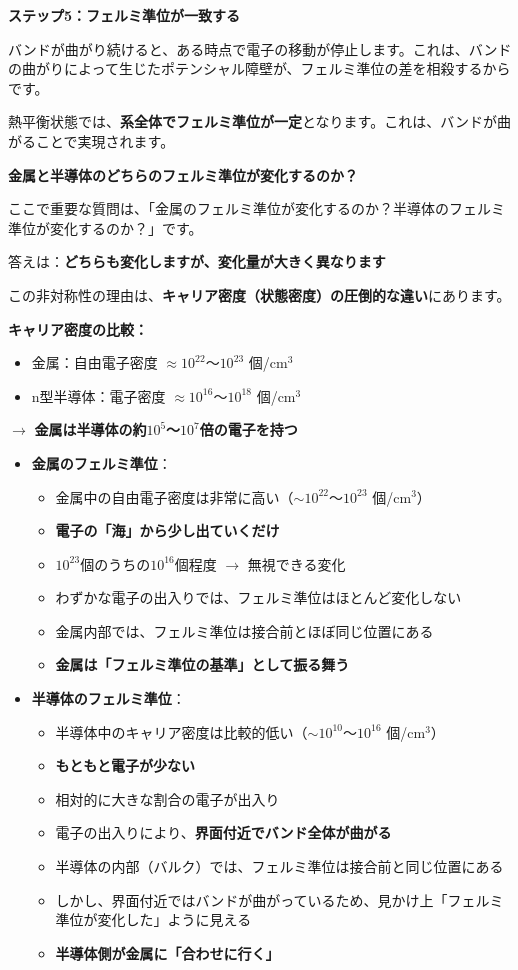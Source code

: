 \textbf{ステップ5：フェルミ準位が一致する}

バンドが曲がり続けると、ある時点で電子の移動が停止します。これは、バンドの曲がりによって生じたポテンシャル障壁が、フェルミ準位の差を相殺するからです。

熱平衡状態では、\textbf{系全体でフェルミ準位が一定}となります。これは、バンドが曲がることで実現されます。

\textbf{金属と半導体のどちらのフェルミ準位が変化するのか？}

ここで重要な質問は、「金属のフェルミ準位が変化するのか？半導体のフェルミ準位が変化するのか？」です。

答えは：\textbf{どちらも変化しますが、変化量が大きく異なります}

この非対称性の理由は、\textbf{キャリア密度（状態密度）の圧倒的な違い}にあります。

\begin{screen}
\textbf{キャリア密度の比較：}
\begin{itemize}
\item 金属：自由電子密度 $\approx 10^{22}$〜$10^{23}$ 個/cm$^3$
\item n型半導体：電子密度 $\approx 10^{16}$〜$10^{18}$ 個/cm$^3$
\end{itemize}
$\rightarrow$ \textbf{金属は半導体の約$10^5$〜$10^7$倍の電子を持つ}
\end{screen}

\begin{itemize}
\item \textbf{金属のフェルミ準位}：
\begin{itemize}
\item 金属中の自由電子密度は非常に高い（$\sim 10^{22}$〜$10^{23}$ 個/cm$^3$）
\item \textbf{電子の「海」から少し出ていくだけ}
\item $10^{23}$個のうちの$10^{16}$個程度 $\rightarrow$ 無視できる変化
\item わずかな電子の出入りでは、フェルミ準位はほとんど変化しない
\item 金属内部では、フェルミ準位は接合前とほぼ同じ位置にある
\item \textbf{金属は「フェルミ準位の基準」として振る舞う}
\end{itemize}

\item \textbf{半導体のフェルミ準位}：
\begin{itemize}
\item 半導体中のキャリア密度は比較的低い（$\sim 10^{10}$〜$10^{16}$ 個/cm$^3$）
\item \textbf{もともと電子が少ない}
\item 相対的に大きな割合の電子が出入り
\item 電子の出入りにより、\textbf{界面付近でバンド全体が曲がる}
\item 半導体の内部（バルク）では、フェルミ準位は接合前と同じ位置にある
\item しかし、界面付近ではバンドが曲がっているため、見かけ上「フェルミ準位が変化した」ように見える
\item \textbf{半導体側が金属に「合わせに行く」}
\end{itemize}
\end{itemize}

